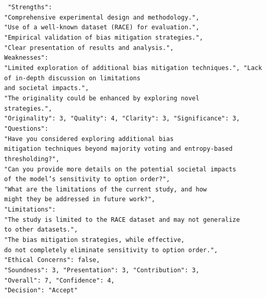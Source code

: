 \documentclass[11pt, a4paper]{gdm_format}
\newcommand{\blank}[1]{\hspace*{#1}\linebreak[0]}
\begin{document}
\begin{tcolorbox}[breakable,colback=blue!5!white, colframe=blue!70!black, title=Example Review ( o1-mini | Word Order Sensitivity )]
\texttt{
 "Strengths": \text{[}\\
	\blank{1cm} "Comprehensive experimental design and methodology.",\\
	\blank{1cm} "Use of a well-known dataset (RACE) for evaluation.",\\
	\blank{1cm} "Empirical validation of bias mitigation strategies.",\\
	\blank{1cm} "Clear presentation of results and analysis."\text{]},\\
Weaknesses": \text{[}\\
	\blank{1cm} "Limited exploration of additional bias mitigation techniques.",
	\blank{1cm} "Lack of in-depth discussion on limitations \\\blank{1cm} and societal impacts.",\\
	\blank{1cm} "The originality could be enhanced by exploring novel \\\blank{1cm} strategies."\text{]},\\
"Originality": 3, "Quality": 4, "Clarity": 3, "Significance": 3,\\
"Questions": \text{[}\\
	\blank{1cm} "Have you considered exploring additional bias \\\blank{1cm} mitigation techniques beyond majority voting and entropy-based \\\blank{1cm} thresholding?",\\
	\blank{1cm} "Can you provide more details on the potential societal impacts\\\blank{1cm}  of the model's sensitivity to option order?",\\
	\blank{1cm} "What are the limitations of the current study, and how\\\blank{1cm}  might they be addressed in future work?"\text{]},\\
"Limitations": \text{[}\\
	\blank{1cm} "The study is limited to the RACE dataset and may not generalize\\\blank{1cm}  to other datasets.",\\
	\blank{1cm} "The bias mitigation strategies, while effective,\\\blank{1cm}  do not completely eliminate sensitivity to option order."\text{]},\\
	"Ethical Concerns": false,\\
	"Soundness": 3, "Presentation": 3, "Contribution": 3, \\"Overall": 7, "Confidence": 4, \\"Decision": "Accept"
}
\end{tcolorbox}
\end{document}

